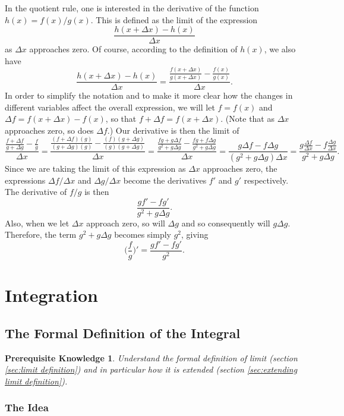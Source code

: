 \documentclass{myarticle}
\theoremstyle{nospace}
\newtheorem*{oldprereq}{Prerequisite Knowledge}
\newenvironment{prereq}{\begin{mdframed}\begin{oldprereq}}{\end{oldprereq}\end{mdframed}}
\newtheorem{old series theorem}{Theorem}
\newenvironment{series theorem}{\begin{mdframed}\begin{old series theorem}}{\end{old series theorem}\end{mdframed}}
\begin{document}
In the quotient rule, one is interested in the derivative of the function $h(x) = f(x)/g(x)$. This is defined as the limit of the expression \[ \frac{h(x + \Delta x) - h(x)}{\Delta x} \] as $\Delta x$ approaches zero. Of course, according to the definition of $h(x)$, we also have \[ \frac{h(x + \Delta x) - h(x)}{\Delta x} = \frac{\frac{f(x + \Delta x)}{g(x + \Delta x)} - \frac{f(x)}{g(x)}}{\Delta x}. \] In order to simplify the notation and to make it more clear how the changes in different variables affect the overall expression, we will let $f = f(x)$ and $\Delta f = f(x + \Delta x) - f(x)$, so that $f + \Delta f = f(x + \Delta x)$. (Note that as $\Delta x$ approaches zero, so does $\Delta f$.) Our derivative is then the limit of \[ \frac{\frac{f + \Delta f}{g + \Delta g} - \frac{f}{g}}{\Delta x} = \frac{\frac{(f + \Delta f)(g)}{(g + \Delta g)(g)} - \frac{(f)(g + \Delta g)}{(g)(g + \Delta g)}}{\Delta x} = \frac{\frac{fg + g\Delta f}{g^2 + g\Delta g} - \frac{fg + f\Delta g}{g^2 + g\Delta g}}{\Delta x} = \frac{g\Delta f - f\Delta g}{(g^2 + g\Delta g)\Delta x} = \frac{g\frac{\Delta f}{\Delta x} - f\frac{\Delta g}{\Delta x}}{g^2 + g\Delta g}. \] Since we are taking the limit of this expression as $\Delta x$ approaches zero, the expressions $\Delta f/\Delta x$ and $\Delta g/\Delta x$ become the derivatives $f'$ and $g'$ respectively. The derivative of $f/g$ is then \[ \frac{gf' - fg'}{g^2 + g\Delta g}. \] Also, when we let $\Delta x$ approach zero, so will $\Delta g$ and so consequently will $g\Delta g$. Therefore, the term $g^2 + g\Delta g$ becomes simply $g^2$, giving \[ \bigg(\frac{f}{g}\bigg)' = \frac{gf' - fg'}{g^2}. \]

\section{Integration} \label{sec:integration}

\subsection{The Formal Definition of the Integral} \label{sec:integral definition}

\begin{prereq} Understand the formal definition of limit (section \ref{sec:limit definition}) and in particular how it is extended (section \ref{sec:extending limit definition}). \end{prereq}

\subsubsection{The Idea} \label{sec:integral definition idea}
\end{document}
